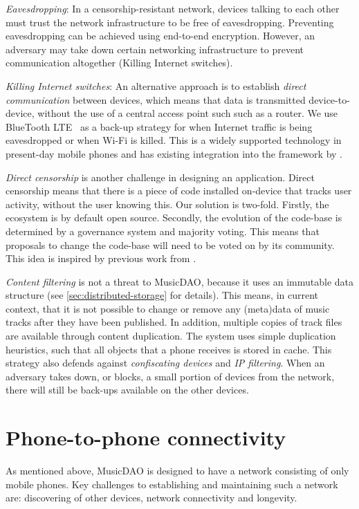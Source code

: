 \textit{Eavesdropping}: In a censorship-resistant network, devices talking to each other must trust the network infrastructure to be free of eavesdropping. Preventing eavesdropping can be achieved using end-to-end encryption. However, an adversary may take down certain networking infrastructure to prevent communication altogether (Killing Internet switches).

\textit{Killing Internet switches}: An alternative approach is to establish \textit{direct communication} between devices, which means that data is transmitted device-to-device, without the use of a central access point such such as a router. We use BlueTooth LTE~\citep{townsend2014getting} as a back-up strategy for when Internet traffic is being eavesdropped or when Wi-Fi is killed. This is a widely supported technology in present-day mobile phones and has existing integration into the framework by \cite{mattskala2020}.

\textit{Direct censorship} is another challenge in designing an application. Direct censorship means that there is a piece of code installed on-device that tracks user activity, without the user knowing this. Our solution is two-fold. Firstly, the ecosystem is by default open source. Secondly, the evolution of the code-base is determined by a governance system and majority voting. This means that proposals to change the code-base will need to be voted on by its community. This idea is inspired by previous work from \cite{jentzsch2016decentralized}.

\textit{Content filtering} is not a threat to MusicDAO, because it uses an immutable data structure (see \ref{sec:distributed-storage} for details). This means, in current context, that it is not possible to change or remove any (meta)data of music tracks after they have been published. In addition, multiple copies of track files are available through content duplication. The system uses simple duplication heuristics, such that all objects that a phone receives is stored in cache. This strategy also defends against \textit{confiscating devices} and \textit{IP filtering}. When an adversary takes down, or blocks, a small portion of devices from the network, there will still be back-ups available on the other devices.

\section{Phone-to-phone connectivity}
As mentioned above, MusicDAO is designed to have a network consisting of only mobile phones. Key challenges to establishing and maintaining such a network are: discovering of other devices, network connectivity and longevity.

